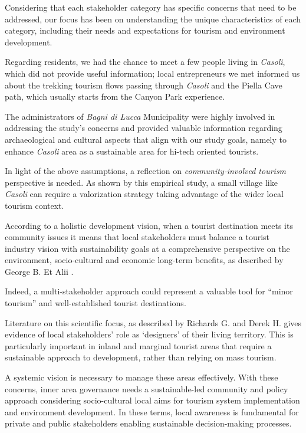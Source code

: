\documentclass[sustainability,article,submit,pdftex,moreauthors]{Definitions/mdpi}
\begin{document}
Considering that each stakeholder category has specific concerns that need to be addressed, our focus has been on understanding the unique characteristics of each category, including their needs and expectations for tourism and environment development. 

Regarding residents, we had the chance to meet a few people living in \emph{Casoli}, which did not provide useful information; local entrepreneurs we met informed us about the trekking tourism flows passing through \emph{Casoli}  and the Piella Cave path, which usually starts from the Canyon Park experience.

The administrators of \emph{Bagni di Lucca} Municipality were highly involved in addressing the study's concerns and provided valuable information regarding archaeological and cultural aspects that align with our study goals, namely to enhance \emph{Casoli}  area as a sustainable area for hi-tech oriented tourists. 

In light of the above assumptions, a reflection on \textit{community-involved tourism} perspective is needed. As shown by this empirical study, a small village like \emph{Casoli}  can require a valorization strategy taking advantage of the wider local tourism context. 

According to a holistic development vision, when a tourist destination meets its community issues it means that local stakeholders must balance a tourist industry vision with sustainability goals at a comprehensive perspective on the environment, socio-cultural and economic long-term benefits, as described by George B. Et Alii \cite {geo07}. 

Indeed,  a multi-stakeholder approach could represent a valuable tool for “minor tourism” and well-established tourist destinations. 

Literature on this scientific focus, as described by Richards G. and Derek H. \cite {ric03} gives evidence of local stakeholders' role as ‘designers’ of their living territory.
This is particularly important in inland and marginal tourist areas that require a sustainable approach to development, rather than relying on mass tourism. 

A systemic vision is necessary to manage these areas effectively. With these concerns, inner area governance needs a sustainable-led community and policy approach considering socio-cultural local aims for tourism system implementation and environment development. 
In these terms, local awareness is fundamental for private and public stakeholders enabling sustainable decision-making processes. 
\end{document}
